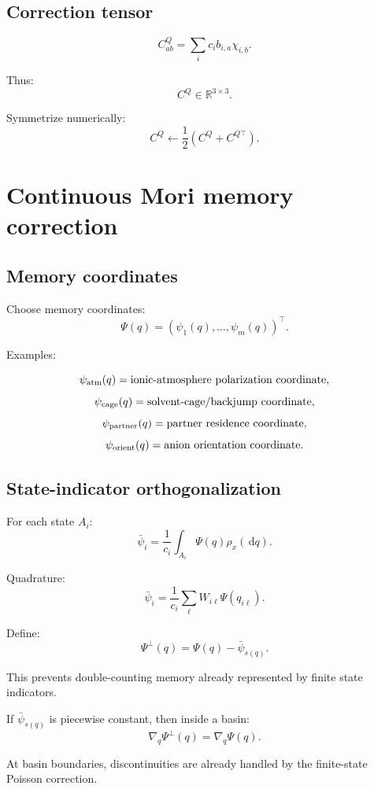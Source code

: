 \documentclass[11pt]{article}
\newcommand{\dd}{\,\mathrm d}
\newcommand{\R}{\mathbb R}
\begin{document}
  \subsection{Correction tensor}

  \[
  C^Q_{ab}
  =
  \sum_i c_i b_{i,a}\chi_{i,b}.
  \]

  Thus:
  \[
  C^Q\in\R^{3\times3}.
  \]

  Symmetrize numerically:
  \[
  C^Q\leftarrow\frac12(C^Q+C^{Q\top}).
  \]

  \section{Continuous Mori memory correction}

  \subsection{Memory coordinates}

  Choose memory coordinates:
  \[
  \Psi(q)
  =
  (\psi_1(q),\ldots,\psi_m(q))^\top.
  \]

  Examples:

  \[
  \psi_{\rm atm}(q)
  =
  \text{ionic-atmosphere polarization coordinate},
  \]
  \[
  \psi_{\rm cage}(q)
  =
  \text{solvent-cage/backjump coordinate},
  \]
  \[
  \psi_{\rm partner}(q)
  =
  \text{partner residence coordinate},
  \]
  \[
  \psi_{\rm orient}(q)
  =
  \text{anion orientation coordinate}.
  \]

  \subsection{State-indicator orthogonalization}

  For each state \(A_i\):
  \[
  \bar\psi_i
  =
  \frac{1}{c_i}
  \int_{A_i}\Psi(q)\rho_x(\dd q).
  \]

  Quadrature:
  \[
  \bar\psi_i
  =
  \frac{1}{c_i}
  \sum_{\ell}W_{i\ell}\Psi(q_{i\ell}).
  \]

  Define:
  \[
  \Psi^\perp(q)=\Psi(q)-\bar\psi_{s(q)}.
  \]

  This prevents double-counting memory already represented by finite state
  indicators.

  If \(\bar\psi_{s(q)}\) is piecewise constant, then inside a basin:
  \[
  \nabla_q\Psi^\perp(q)=\nabla_q\Psi(q).
  \]

  At basin boundaries, discontinuities are already handled by the finite-state
  Poisson correction.
\end{document}
